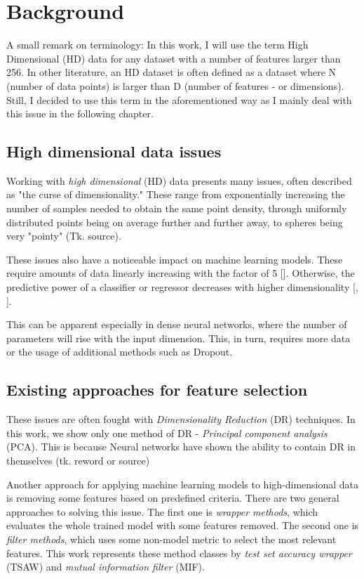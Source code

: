 \chapter{Background}
A small remark on terminology: In this work, I will use the term High Dimensional (HD) data for any dataset with a number of features larger than 256. In other literature, an HD dataset is often defined as a dataset where N (number of data points) is larger than D (number of features - or dimensions). Still, I decided to use this term in the aforementioned way as I mainly deal with this issue in the following chapter.


\section{High dimensional data issues}
Working with \textit{high dimensional} (HD) data presents many issues, often described as "the curse of dimensionality." These range from exponentially increasing the number of samples needed to obtain the same point density, through uniformly distributed points being on average further and further away, to spheres being very "pointy" (Tk. source). 

These issues also have a noticeable impact on machine learning models. These require amounts of data linearly increasing with the factor of 5 [\cite{Koutroumbas}]. Otherwise, the predictive power of a classifier or regressor decreases with higher dimensionality [\cite{McLachlan}, \cite{Trunk}].

This can be apparent especially in dense neural networks, where the number of parameters will rise with the input dimension. This, in turn, requires more data or the usage of additional methods such as Dropout.

\section{Existing approaches for feature selection}
These issues are often fought with \textit{Dimensionality Reduction} (DR) techniques. In this work, we show only one method of DR - \textit{Principal component analysis} (PCA). This is because Neural networks have shown the ability to contain DR in themselves (tk. reword or source)

Another approach for applying machine learning models to high-dimensional data is removing some features based on predefined criteria. There are two general approaches to solving this issue. The first one is \textit{wrapper methods}, which evaluates the whole trained model with some features removed. The second one is \textit{filter methods}, which uses some non-model metric to select the most relevant features. This work represents these method classes by \textit{test set accuracy wrapper} (TSAW) and \textit{mutual information filter} (MIF).

